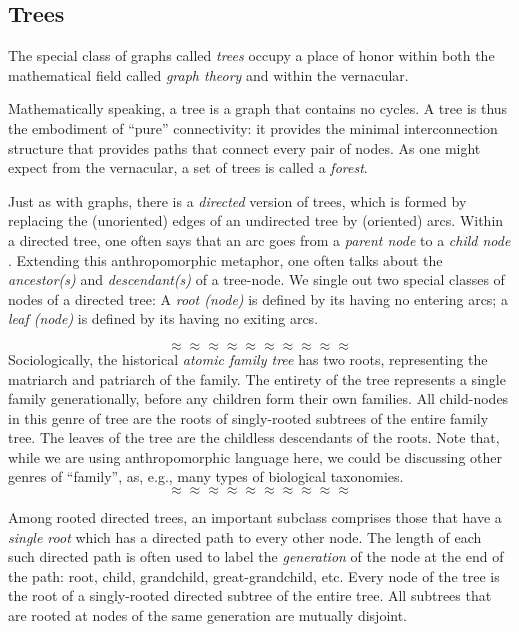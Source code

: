 \subsection{Trees}
\label{sec:Trees}

The special class of graphs called {\it trees} 
 occupy a place of honor within both the mathematical
field called {\it graph theory} and within the vernacular.

Mathematically speaking, a tree is a graph that contains no cycles.  A
tree is thus the embodiment of ``pure'' connectivity: it provides the
minimal interconnection structure that provides paths that connect
every pair of nodes.  As one might expect from the vernacular, a set
of trees is called a {\it forest}. 

Just as with graphs, there is a {\em directed} version of trees, which
is formed by replacing the (unoriented) edges of an undirected tree by
(oriented) arcs.  Within a directed tree, one often says that an arc
goes from a {\it parent node}  to a {\it
  child node} .  Extending this
anthropomorphic metaphor, one often talks about the {\it ancestor(s)}
 and {\it descendant(s)}
 of a tree-node.  We single out two
special classes of nodes of a directed tree: A {\it root (node)}
  is defined
by its having no entering arcs; a {\it leaf (node)}   is defined by its having
no exiting arcs.

\[ \approx \approx \approx \approx \approx \approx \approx \approx \approx \approx \]
Sociologically, the historical {\it atomic family tree}  has two roots, representing the matriarch and patriarch of the
family.  The entirety of the tree represents a single family
generationally, before any children form their own families.  All
child-nodes in this genre of tree are the roots of singly-rooted
subtrees of the entire family tree.  The leaves of the tree are the
childless descendants of the roots.  Note that, while we are using
anthropomorphic language here, we could be discussing other genres of
``family'', as, e.g., many types of biological taxonomies.
\[ \approx \approx \approx \approx \approx \approx \approx \approx \approx \approx \]

Among rooted directed trees, an important subclass comprises those
that have a {\em single root} which has a directed path to every other
node.  The length of each such directed path is often used to label
the {\it generation}
of the node at the end of the path: root, child, grandchild,
great-grandchild, etc.
Every node of the tree is the root of a singly-rooted directed
subtree of the entire tree.  All subtrees that are rooted at nodes of
the same generation are mutually disjoint.

